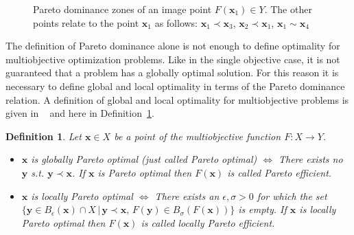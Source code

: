 \documentclass[a4paper,10pt]{article}
\newtheorem{definition}{Definition}
\renewcommand{\vec}[1]{\mathbf{#1}}
\newcommand{\defref}[1]{Definition~\ref{#1}}
\begin{document}
    \begin{figure}
        \centering
        \caption[Pareto dominance]{
            Pareto dominance zones of an image point $F(\vec{x}_1) \in Y$.
            The other points relate to the point $\vec{x}_1$ as follows:
            $\vec{x}_1 \prec \vec{x}_3$, 
            $\vec{x}_2 \prec \vec{x}_1$, $\vec{x}_1 \sim \vec{x}_4$
        }
        \label{fig:dominance_zones}
    \end{figure}

    The definition of Pareto dominance alone is not enough to define optimality
    for multiobjective optimization problems.
    Like in the single objective case, it is not guaranteed that a problem
    has a globally optimal solution.
    For this reason it is necessary to define global and local optimality
    in terms of the Pareto dominance relation.
    A definition of global and local optimality for multiobjective problems
    is given in ~\cite{multiobjective} and here in \defref{def:optimality_multi}.

    \begin{definition}
        \label{def:optimality_multi}
        Let $\vec{x} \in X$ be a point of the multiobjective function $F: X \rightarrow Y$.
        \begin{itemize}
            \item $\vec{x}$ is globally Pareto optimal (just called Pareto optimal) 
            $\Longleftrightarrow$
            There exists no $\vec{y}$ s.t. $\vec{y} \prec \vec{x}$.
            If $\vec{x}$ is Pareto optimal then $F(\vec{x})$ is called
            Pareto efficient.

            \item $\vec{x}$ is locally Pareto optimal $\Longleftrightarrow$
            There exists an $\epsilon, \sigma > 0$ for which the set
            $\{\vec{y} \in B_{\epsilon}(\vec{x}) \cap X \, | \, \vec{y} \prec \vec{x},\, 
            F(\vec{y}) \in B_{\sigma}(F(\vec{x})) \}$ is empty.
            If $\vec{x}$ is locally Pareto optimal then $F(\vec{x})$ is called
            locally Pareto efficient.
        \end{itemize}
    \end{definition}
\end{document}
